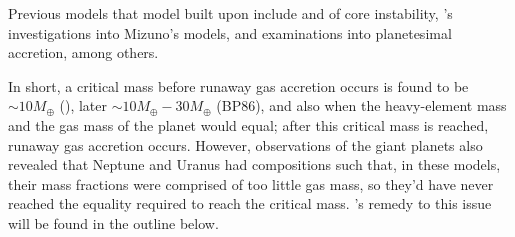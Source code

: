 \documentclass[11pt]{report}
\begin{document}
\begin{mainf}
\begin{sloppypar}
Previous models that \citealp{Pollack1996} model built upon include \citealp{Mizuno1978} and \citealp{Mizuno1980} of core instability, \citealp{Bodenheimer1986}'s investigations into Mizuno's models,
\citealp{Pollack1986} and \citealp{Podolak1988} examinations into planetesimal accretion, among others.

In short, a critical mass before runaway gas accretion occurs is found to be $\sim 10M_\oplus$ (\citealp{Mizuno1980}), later $\sim 10M_\oplus - 30M_\oplus$ (BP86), and also when the heavy-element mass
and the gas mass of the planet would equal; after this critical mass is reached, runaway gas accretion occurs. However, observations of the giant planets also revealed that Neptune and Uranus had compositions such that, 
in these models, their mass fractions were comprised of too little gas mass, so they'd have never reached the equality required to reach the critical mass. \citealp{Pollack1996}'s remedy to this issue
will be found in the outline below.
\end{sloppypar}



\end{mainf}
\end{document}
